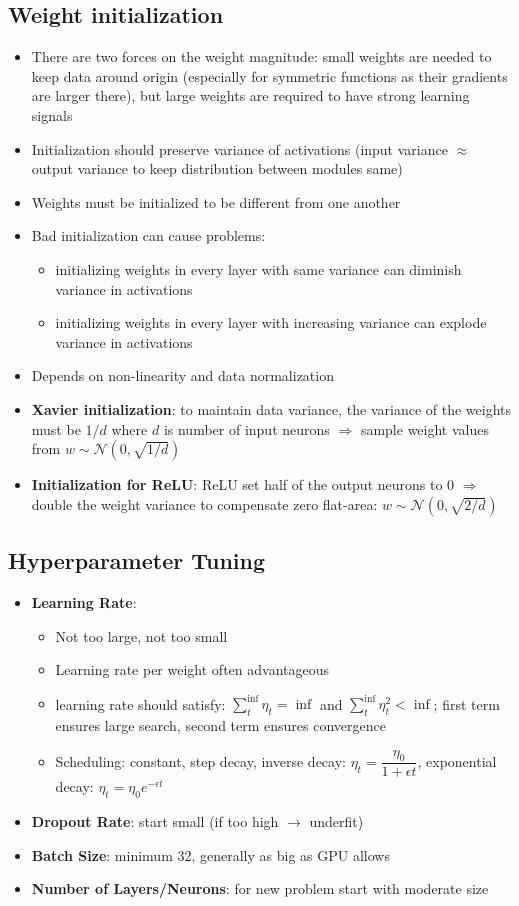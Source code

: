 \subsection{Weight initialization}
\begin{itemize}
	\item There are two forces on the weight magnitude: small weights are needed to keep data around origin (especially for symmetric functions as their gradients are larger there), but large weights are required to have strong learning signals
	\item Initialization should preserve variance of activations (input variance $\approx$ output variance to keep distribution between modules same)
	\item Weights must be initialized to be different from one another
	\item Bad initialization can cause problems:
	\begin{itemize}
		\item initializing weights in every layer with same variance can diminish variance in activations
		\item initializing weights in every layer with increasing variance can explode variance in activations
	\end{itemize}
	\item Depends on non-linearity and data normalization
	\item \textbf{Xavier initialization}: to maintain data variance, the variance of the weights must be $1/d$ where $d$ is number of input neurons $\Rightarrow$ sample weight values from $w\sim\mathcal{N}(0,\sqrt{1/d})$
	\item \textbf{Initialization for ReLU}: ReLU set half of the output neurons to 0 $\Rightarrow$ double the weight variance to compensate zero flat-area: $w\sim\mathcal{N}(0,\sqrt{2/d})$
\end{itemize}
\subsection{Hyperparameter Tuning}
\begin{itemize}
	\item \textbf{Learning Rate}: 
	\begin{itemize}
		\item Not too large, not too small
		\item Learning rate per weight often advantageous
		\item learning rate should satisfy: $\sum_{t}^{\inf} \eta_t = \inf$ and $\sum_{t}^{\inf} \eta_t^2 < \inf$; first term ensures large search, second term ensures convergence
		\item Scheduling: constant, step decay, inverse decay: $\eta_t = \dfrac{\eta_0}{1+ \epsilon t}$, exponential decay: $\eta_t = \eta_0 e^{-\epsilon t}$
	\end{itemize}
	\item \textbf{Dropout Rate}: start small (if too high $\rightarrow$ underfit)
	\item \textbf{Batch Size}: minimum 32, generally as big as GPU allows
	\item \textbf{Number of Layers/Neurons}: for new problem start with moderate size
\end{itemize}

